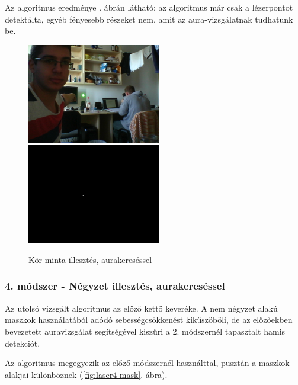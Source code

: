 \documentclass[a4paper,oneside]{article}
\begin{document}
Az algoritmus eredménye . ábrán látható: az algoritmus már csak a lézerpontot detektálta, egyéb fényesebb részeket nem, amit az aura-vizsgálatnak tudhatunk be.

\begin{figure}[tbh]
  \centering
  \includegraphics[width=165pt]{figs/laser.png} \hspace{5pt}  \includegraphics[width=165pt]{figs/laser3-b.png}
  \caption{Kör minta illesztés, aurakereséssel \label{fig:laser3}}
\end{figure}

\subsubsection{4. módszer - Négyzet illesztés, aurakereséssel}

Az utolsó vizsgált algoritmus az előző kettő keveréke. A nem négyzet alakú maszkok használatából adódó sebességcsökkenést kiküszöböli, de az előzőekben bevezetett auravizsgálat segítségével kiszűri a 2. módszernél tapasztalt hamis detekciót.

Az algoritmus megegyezik az előző módszernél használttal, pusztán a maszkok alakjai különböznek (\ref{fig:laser4-mask}. ábra).
\end{document}
